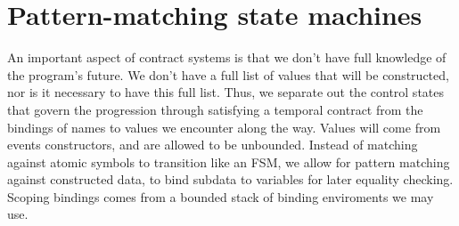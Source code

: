 \documentclass[preprint,onecolumn,9pt]{sigplanconf} %
\begin{document}
\section{Pattern-matching state machines}

An important aspect of contract systems is that we don't have full knowledge of the program's future.
%
We don't have a full list of values that will be constructed, nor is it necessary to have this full list.
%
Thus, we separate out the control states that govern the progression through satisfying a temporal contract from the bindings of names to values we encounter along the way.
%
Values will come from events constructors, and are allowed to be unbounded.
%
Instead of matching against atomic symbols to transition like an FSM, we allow for pattern matching against constructed data, to bind subdata to variables for later equality checking.
%
Scoping bindings comes from a bounded stack of binding enviroments we may use.
%
\end{document}
